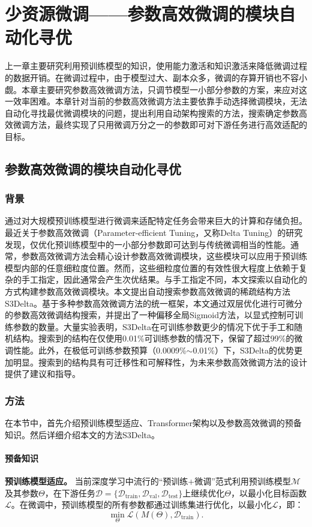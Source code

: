 \chapter{少资源微调——参数高效微调的模块自动化寻优}

上一章主要研究利用预训练模型的知识，使用能力激活和知识激活来降低微调过程的数据开销。在微调过程中，由于模型过大、副本众多，微调的存算开销也不容小觑。本章主要研究参数高效微调方法，只调节模型一小部分参数的方案，来应对这一效率困难。本章针对当前的参数高效微调方法主要依靠手动选择微调模块，无法自动化寻找最优微调模块的问题，提出利用自动架构搜索的方法，搜索确定参数高效微调方法，最终实现了只用微调万分之一的参数即可对下游任务进行高效适配的目标。

\section{参数高效微调的模块自动化寻优}

\subsection{背景}

通过对大规模预训练模型进行微调来适配特定任务会带来巨大的计算和存储负担。最近关于参数高效微调（Parameter-efficient Tuning，又称Delta Tuning）的研究发现，仅优化预训练模型中的一小部分参数即可达到与传统微调相当的性能。通常，参数高效微调方法会精心设计参数高效微调模块，这些模块可以应用于预训练模型内部的任意细粒度位置。然而，这些细粒度位置的有效性很大程度上依赖于复杂的手工指定，因此通常会产生次优结果。与手工指定不同，本文探索以自动化的方式构建参数高效微调模块。本文提出自动搜索参数高效微调的稀疏结构方法S3Delta。基于多种参数高效微调方法的统一框架，本文通过双层优化进行可微分的参数高效微调结构搜索，并提出了一种偏移全局Sigmoid方法，以显式控制可训练参数的数量。大量实验表明，S3Delta在可训练参数更少的情况下优于手工和随机结构。搜索到的结构在仅使用0.01\%可训练参数的情况下，保留了超过99\%的微调性能。此外，在极低可训练参数预算（0.0009\%$\sim$0.01\%）下，S3Delta的优势更加明显。搜索到的结构具有可迁移性和可解释性，为未来参数高效微调方法的设计提供了建议和指导。


\subsection{方法}
在本节中，首先介绍预训练模型适应、Transformer架构以及参数高效微调的预备知识。然后详细介绍本文的方法S3Delta。

\subsubsection{预备知识}
\label{sec:meth:preliminaries}
\textbf{预训练模型适应。} 当前深度学习中流行的“预训练+微调”范式利用预训练模型$\mathcal{M}$及其参数$\Theta$，在下游任务$\mathcal{D}=\{\mathcal{D}_{\text{train}}, \mathcal{D}_{\text{val}}, \mathcal{D}_{\text{test}}\}$上继续优化$\Theta$，以最小化目标函数$\mathcal{L}$。在微调中，预训练模型的所有参数都通过训练集进行优化，以最小化$\mathcal{L}$，即：
\begin{equation}
   \operatorname{min}_\Theta \mathcal{L}(M(\Theta), \mathcal{D}_{\text{train}}).
\end{equation}

